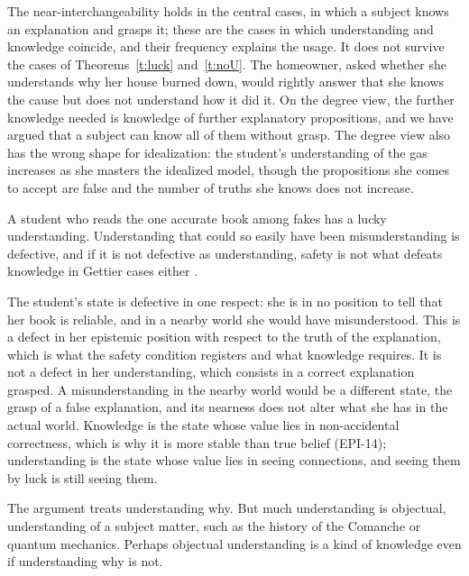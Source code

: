 \documentclass{situationist-preprint}
\begin{document}
\begin{reply}
The near-interchangeability holds in the central cases, in which a subject knows an explanation and grasps it; these are the cases in which understanding and knowledge coincide, and their frequency explains the usage. It does not survive the cases of Theorems~\ref{t:luck} and~\ref{t:noU}. The homeowner, asked whether she understands why her house burned down, would rightly answer that she knows the cause but does not understand how it did it. On the degree view, the further knowledge needed is knowledge of further explanatory propositions, and we have argued that a subject can know all of them without grasp. The degree view also has the wrong shape for idealization: the student's understanding of the gas increases as she masters the idealized model, though the propositions she comes to accept are false and the number of truths she knows does not increase.
\end{reply}

\begin{objection}\label{o:grimm}
A student who reads the one accurate book among fakes has a lucky understanding. Understanding that could so easily have been misunderstanding is defective, and if it is not defective as understanding, safety is not what defeats knowledge in Gettier cases either \citep{Grimm2006}.
\end{objection}

\begin{reply}
The student's state is defective in one respect: she is in no position to tell that her book is reliable, and in a nearby world she would have misunderstood. This is a defect in her epistemic position with respect to the truth of the explanation, which is what the safety condition registers and what knowledge requires. It is not a defect in her understanding, which consists in a correct explanation grasped. A misunderstanding in the nearby world would be a different state, the grasp of a false explanation, and its nearness does not alter what she has in the actual world. Knowledge is the state whose value lies in non-accidental correctness, which is why it is more stable than true belief (EPI-14); understanding is the state whose value lies in seeing connections, and seeing them by luck is still seeing them.
\end{reply}

\begin{objection}\label{o:object}
The argument treats understanding why. But much understanding is objectual, understanding of a subject matter, such as the history of the Comanche or quantum mechanics. Perhaps objectual understanding is a kind of knowledge even if understanding why is not.
\end{objection}
\end{document}
